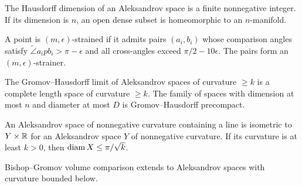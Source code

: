 \begin{theorem}
\label{thm:chow-iii-g40-g42-regularity}
The Hausdorff dimension of an Aleksandrov space is a finite nonnegative integer.
If its dimension is $n$, an open dense subset is homeomorphic to an
$n$-manifold.
\end{theorem}

\begin{definition}[Strainers]
\label{def:chow-iii-g41-strainers}

A point is $(m,\epsilon)$-strained if it admits pairs $(a_i,b_i)$ whose
comparison angles satisfy
$\widetilde\angle a_ipb_i>\pi-\epsilon$ and all cross-angles exceed
$\pi/2-10\epsilon$.  The pairs form an $(m,\epsilon)$-strainer.
\end{definition}

\begin{theorem}
\label{thm:chow-iii-g43-g44-compactness}

The Gromov--Hausdorff limit of Aleksandrov spaces of curvature $\geq k$ is a
complete length space of curvature $\geq k$.  The family of spaces with
dimension at most $n$ and diameter at most $D$ is Gromov--Hausdorff precompact.
\end{theorem}

\begin{theorem}
\label{thm:chow-iii-g45-g46-splitting-diameter}

An Aleksandrov space of nonnegative curvature containing a line is isometric to
$Y\times\mathbb R$ for an Aleksandrov space $Y$ of nonnegative curvature.  If its
curvature is at least $k>0$, then $\operatorname{diam} X\leq\pi/\sqrt{k}$.
\end{theorem}

\begin{remark}
\label{rem:chow-iii-g47-volume-comparison}
Bishop--Gromov volume comparison extends to Aleksandrov spaces with curvature
bounded below.
\end{remark}

